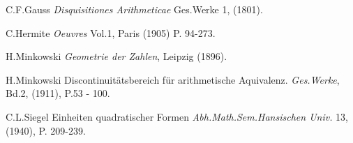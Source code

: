 \begin{thebibliography}{99}
  C.F.\@ Gauss  {\em Disquisitiones Arithmeticae} Ges.\@ Werke 1,
(1801).

 C.\@ Hermite  {\em Oeuvres} Vol.1, Paris (1905) P.\@
94-273.

 H.\@ Minkowski  {\em Geometrie der Zahlen}, Leipzig (1896).

 H.\@ Minkowski  Discontinuit\"atsbereich f\"ur arithmetische
Aquivalenz.  {\em Ges.\@ Werke}, Bd.2, (1911), P.53 - 100.

  C.L.\@ Siegel  Einheiten quadratischer Formen
   {\em Abh.\@ Math.\@ Sem.\@ Hansischen Univ.} 13, (1940), P.\@
   209-239.
\end{thebibliography}
